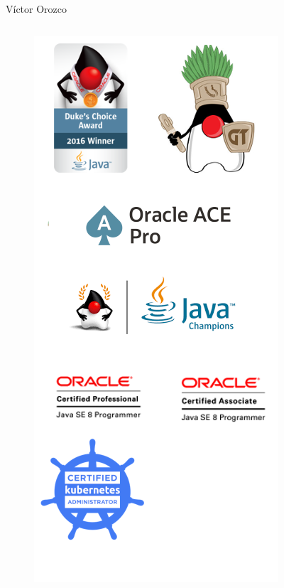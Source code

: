 \documentclass[aspectratio=169]{beamer}
\begin{document}
	\begin{frame}{Víctor Orozco}
		\begin{columns}[T] %
			
			\begin{column}[T]{4cm} %
				\begin{figure}
					\centering
					\includegraphics[width=0.8\linewidth]{Images/logos}
				\end{figure}

\end{column}
\end{columns}
\end{frame}
\end{document}
